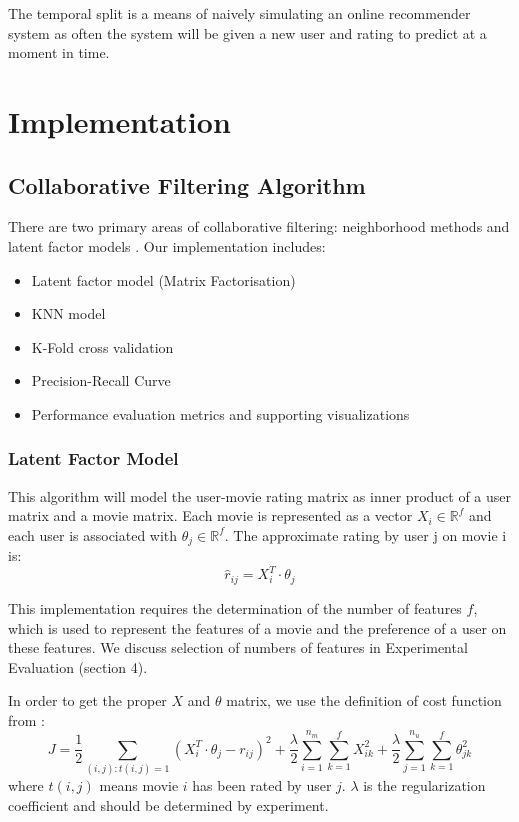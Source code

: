 \documentclass[12pt]{article}
\begin{document}
The temporal split is a means of naively simulating an online recommender system as often the system will be given a new user and rating to predict at a moment in time.

\section{Implementation}

\subsection{Collaborative Filtering Algorithm}
There are two primary areas of collaborative filtering: neighborhood methods and latent factor models \cite{MF}. Our implementation includes: 
\begin{itemize} 
	\item Latent factor model (Matrix Factorisation)
	\item KNN model
	\item K-Fold cross validation
	\item Precision-Recall Curve 
	\item Performance evaluation metrics and supporting visualizations
\end{itemize}

\subsubsection{Latent Factor Model}
This algorithm will model the user-movie rating matrix as inner product of a user matrix and a movie matrix. Each movie is represented as a vector $X_i \in \mathbb{R}^f$ and each user is associated with $\theta_j \in \mathbb{R}^f$. The approximate rating by user j on movie i is:
$$\hat{r}_{ij} = X_i^T \cdot \theta_j$$

This implementation requires the determination of the number of features $f$, which is used to represent the features of a movie and the preference of a user on these features. We discuss selection of numbers of features in Experimental Evaluation (section 4).

In order to get the proper $X$ and $\theta$ matrix, we use the definition of cost function from \cite{MF}:
$$J = \frac{1}{2}\sum_{(i,j):t(i,j)=1}(X_i^T \cdot \theta_j - r_{ij})^2+\frac{\lambda}{2}\sum_{i = 1}^{n_m}\sum_{k = 1}^{f}X_{ik}^{2}+\frac{\lambda}{2}\sum_{j = 1}^{n_u}\sum_{k = 1}^{f}\theta_{jk}^{2}$$
where $t(i,j)$ means movie $i$ has been rated by user $j$. $\lambda$ is the regularization coefficient and should be determined by experiment.
\end{document}
